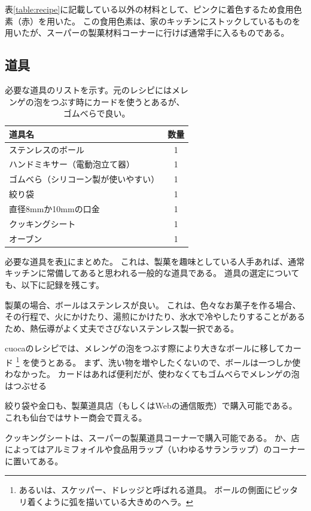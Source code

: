 \documentclass[uplatex,dvipdfmx,a4j,12pt]{jsarticle}
\begin{document}
表\ref{table:recipe}に記載している以外の材料として、ピンクに着色するため食用色素（赤）を用いた。
この食用色素は、家のキッチンにストックしているものを用いたが、スーパーの製菓材料コーナーに行けば通常手に入るものである。

\subsection{道具}

\begin{table}[t]
    \centering
    \caption{必要な道具のリストを示す。元のレシピにはメレンゲの泡をつぶす時にカードを使うとあるが、ゴムべらで良い。}
    \begin{tabular}{lc}
        道具名              & 数量 \\
        \hline
        ステンレスのボール      & 1 \\
        ハンドミキサー（電動泡立て器） & 1 \\
        ゴムべら（シリコーン製が使いやすい）  & 1 \\
        絞り袋 & 1 \\
        直径8mmか10mmの口金 & 1 \\
        クッキングシート & 1 \\
        オーブン & 1 \\
        \hline
    \end{tabular}
    \label{table:tools}
\end{table}

必要な道具を表\ref{table:tools}にまとめた。
これは、製菓を趣味としている人手あれば、通常キッチンに常備してあると思われる一般的な道具である。
道具の選定についても、以下に記録を残こす。

製菓の場合、ボールはステンレスが良い。
これは、色々なお菓子を作る場合、その行程で、火にかけたり、湯煎にかけたり、氷水で冷やしたりすることがあるため、熱伝導がよく丈夫でさびないステンレス製一択である。

cuocaのレシピでは、メレンゲの泡をつぶす際により大きなボールに移してカード
\footnote{
    あるいは、スケッパー、ドレッジと呼ばれる道具。
    ボールの側面にピッタリ着くように弧を描いている大きめのヘラ。
}
を使うとある。
まず、洗い物を増やしたくないので、ボールは一つしか使わなかった。
カードはあれば便利だが、使わなくてもゴムべらでメレンゲの泡はつぶせる

絞り袋や金口も、製菓道具店（もしくはWebの通信販売）で購入可能である。
これも仙台ではサトー商会で買える。

クッキングシートは、スーパーの製菓道具コーナーで購入可能である。
か、店によってはアルミフォイルや食品用ラップ（いわゆるサランラップ）のコーナーに置いてある。
\end{document}
